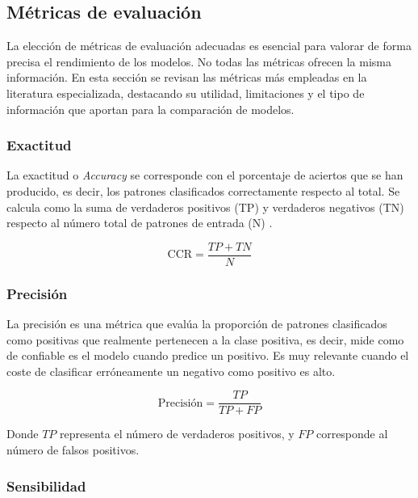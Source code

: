
\subsection{Métricas de evaluación}
\label{subsec:2_metricas}

La elección de métricas de evaluación adecuadas es esencial para valorar de forma precisa el rendimiento de los modelos. No todas las métricas ofrecen la misma información. En esta sección se revisan las métricas más empleadas en la literatura especializada, destacando su utilidad, limitaciones y el tipo de información que aportan para la comparación de modelos.

\subsubsection{Exactitud}
\label{subsubsec:acc}

La exactitud o \textit{Accuracy} se corresponde con el porcentaje de aciertos que se han producido, es decir, los patrones clasificados correctamente respecto al total. Se calcula como la suma de verdaderos positivos (TP) y verdaderos negativos (TN) respecto al número total de patrones de entrada (N) \cite{metrics}.

\begin{equation}
	\label{eq:accuracy}
	\text{CCR} = \frac{TP+TN}{N}
\end{equation}

\subsubsection{Precisión}
\label{subsubsec:prec}

La precisión es una métrica que evalúa la proporción de patrones clasificados como positivas que realmente pertenecen a la clase positiva, es decir, mide como de confiable es el modelo cuando predice un positivo. Es muy relevante cuando el coste de clasificar erróneamente un negativo como positivo es alto.

\begin{equation}
	\text{Precisión} = \frac{TP}{TP + FP}
	\label{eq:precision}
\end{equation}

Donde \(TP\) representa el número de verdaderos positivos, y \(FP\) corresponde al número de falsos positivos.

\subsubsection{Sensibilidad}
\label{subsubsec:sens}

